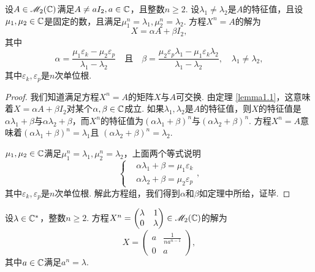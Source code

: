 \begin{theorem}[方程$X^n=A,a\ne aI_2,a\in\MC$.]

  设$A\in\mathscr M_2(\mathbb C)$满足$A\ne aI_2,a\in\mathbb C$，且整数$n\ge2$. 设$\lambda_1\ne\lambda_2$是$A$的特征值，且设$\mu_1,\mu_2\in\mathbb C$是固定的数，且满足$\mu_1^n=\lambda_1,\mu_2^n=\lambda_2$. 方程$X^n=A$的解为
  \[
    X = \alpha A + \beta I_2,
  \]
  其中
  \[
    \alpha = \frac{\mu_1\varepsilon_k-\mu_2\varepsilon_p}{\lambda_1
    -\lambda_2}\quad \text{且} \quad
    \beta = \frac{\mu_2\varepsilon_p\lambda_1-\mu_1\varepsilon_k
    \lambda_2}{\lambda_1-\lambda_2},\quad \lambda_1\ne\lambda_2,
  \]
  其中$\varepsilon_k,\varepsilon_p$是$n$次单位根.
\end{theorem}

\begin{proof}
  我们知道满足方程$X^n=A$的矩阵$X$与$A$可交换. 由定理 \ref{lemma1.1}，这意味着$X=\alpha A+\beta I_2$对某个$\alpha,\beta\in\mathbb C$成立. 如果$\lambda_1,\lambda_2$是$A$的特征值，则$X$的特征值是$\alpha\lambda_1+\beta$与$\alpha\lambda_2+\beta$，而$X^n$的特征值为$(\alpha\lambda_1+\beta)^n$与$(\alpha\lambda_2+\beta)^n$. 方程$X^n=A$意味着$(\alpha\lambda_1+\beta)^n=\lambda_1$且
  $(\alpha\lambda_2+\beta)^n=\lambda_2$.

  $\mu_1,\mu_2\in\mathbb C$满足$\mu_1^n=\lambda_1,\mu_2^n=\lambda_2$，上面两个等式说明
  \[
    \left\{
      \begin{aligned}
        & \alpha \lambda_1 + \beta = \mu_1\varepsilon_k \\
        & \alpha\lambda_2 + \beta = \mu_2\varepsilon_p
      \end{aligned}
    \right.,
  \]
  其中$\varepsilon_k,\varepsilon_p$是$n$次单位根. 解此方程组，我们得到$\alpha$和$\beta$如定理中所给，证毕.
\end{proof}

\begin{lemma}

  设$\lambda\in\mathbb C^\ast$，整数$n\ge2$. 方程$X^n=\begin{pmatrix}
    \lambda & 1 \\
    0 & \lambda
  \end{pmatrix}\in\mathscr M_2(\mathbb C)$的解为
  \[
    X = \begin{pmatrix}
      a & \frac1{na^{n-1}} \\
      0 & a
    \end{pmatrix},
  \]
  其中$a\in\mathbb C$满足$a^n=\lambda$.
\end{lemma}

